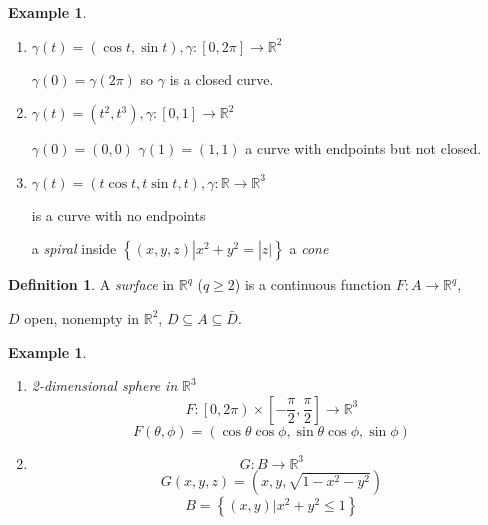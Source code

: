 \documentclass[12pt]{amsbook}
\theoremstyle{definition}
\newtheorem{definition}[theorem]{Definition}
\newtheorem{example}[theorem]{Example}
\newcommand{\RR}{{\mathbb R}}
\newcommand{\ra}{\rightarrow} %
\begin{document}
\begin{example}
\begin{enumerate}
\item $\gamma(t) = \left(\cos t, \sin t\right), \gamma: [0, 2\pi] \ra \RR^2$

$\gamma(0) = \gamma(2\pi)$ so $\gamma$ is a closed curve.


\item $\gamma(t) = \left(t^2, t^3 \right), \gamma: [0, 1] \ra \RR^2$

$\gamma(0) = (0,0)$  $\gamma(1) = (1,1)$ a curve with endpoints but not closed.


\item $\gamma(t) = \left(t \cos t, t \sin t, t \right), \gamma: \RR \ra \RR^3$

is a curve with no endpoints

a \emph{spiral} inside $\left\{(x,y,z) | x^2 + y^2 = |z|\right\}$ a \emph{cone}

\end{enumerate}
\end{example}


\begin{definition} A \emph{surface} in $\RR^q$ ($q \geq 2$) is a continuous function $F : A \ra \RR^q$, 

$D$ open, nonempty in $\RR^2$, $D \subseteq A \subseteq \bar D$.
\end{definition}

\begin{example}
\begin{enumerate}
\item \emph{2-dimensional sphere in} $\RR^3$
\begin{equation*}F : \left[0, 2\pi\right) \times \left[-\frac{\pi}{2}, \frac{\pi}{2}\right] \ra \RR^3 \end{equation*}
\begin{equation*}F(\theta, \phi) = (\cos \theta \cos \phi, \sin \theta \cos \phi, \sin \phi) \end{equation*}



\item

\begin{equation*}G : B \ra \RR^3 \end{equation*}
\begin{equation*}G(x,y,z) = \left(x, y, \sqrt{1-x^2-y^2}\right) \end{equation*}
\begin{equation*}B = \left\{ (x, y) | x^2+y^2 \leq 1 \right\} \end{equation*}


\end{enumerate}
\end{example}
\end{document}

